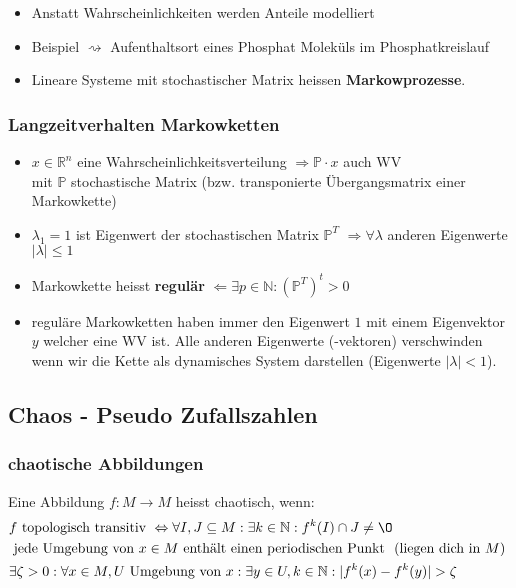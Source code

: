 \documentclass[a4paper]{article}
\newcommand{\R}{\mathbb{R}}
\begin{document}
\begin{itemize}
	\item Anstatt Wahrscheinlichkeiten werden Anteile modelliert
	\item Beispiel $\rightsquigarrow$ Aufenthaltsort eines Phosphat Moleküls im
		Phosphatkreislauf
	\item Lineare Systeme mit stochastischer Matrix heissen
		\textbf{Markowprozesse}.
\end{itemize}

\subsubsection{Langzeitverhalten Markowketten}
\begin{itemize}
	\item $x \in \R ^{n}$ eine Wahrscheinlichkeitsverteilung
		$\Rightarrow \mathbb{P} \cdot x$ auch WV \\
		mit $\mathbb{P}$ stochastische Matrix
		(bzw. transponierte Übergangsmatrix einer Markowkette)
	\item $\lambda_1 = 1$ ist Eigenwert der stochastischen Matrix
		$\mathbb{P} ^{T}$
		$\Rightarrow \forall \lambda$ anderen Eigenwerte
		$| \lambda | \leq 1$
	\item Markowkette heisst \textbf{regulär}
		$\Leftarrow \exists p \in \mathbb{N}: \left(
			\mathbb{P} ^{T}
		\right) ^{t} > 0$
	\item reguläre Markowketten haben immer den Eigenwert $1$
		mit einem Eigenvektor $y$ welcher eine WV ist.
		Alle anderen Eigenwerte (-vektoren) verschwinden
		wenn wir die Kette als dynamisches System darstellen
		(Eigenwerte $|\lambda|<1$).
\end{itemize}

\setcounter{equation}{0}

\subsection{Chaos - Pseudo Zufallszahlen}

\subsubsection{chaotische Abbildungen}
Eine Abbildung $f: M \rightarrow M$ heisst chaotisch, wenn:
\begin{align}
	& f \text{ topologisch transitiv }
	\Leftrightarrow \forall I, J \subseteq M: \exists k \in \mathbb{N}:
	f ^{k} (I) \cap J \ne \O
	\\
	& \text{ jede Umgebung von $x \in M$ enthält einen periodischen Punkt } 
	\text{ (liegen dich in $M$) }
	\\
	& \exists \zeta > 0: \forall x \in M
	, U \text{ Umgebung von } x:
	\exists y \in U, k \in \mathbb{N}:
	|f ^{k} (x) - f ^{k} (y) | > \zeta
\end{align}
\end{document}

